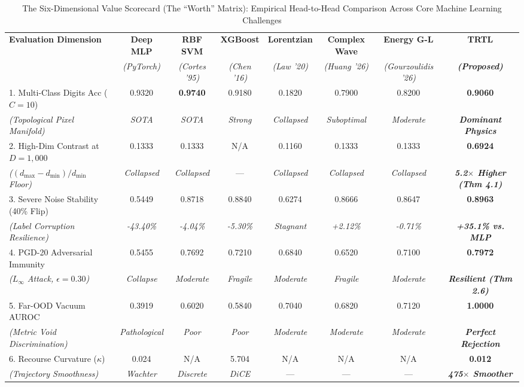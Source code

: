 \documentclass[journal,twoside]{IEEEtran}
\theoremstyle{remark}
\begin{document}
\begin{table}[!t]
\centering
\caption{The Six-Dimensional Value Scorecard (The ``Worth'' Matrix): Empirical Head-to-Head Comparison Across Core Machine Learning Challenges}
\label{tab:scorecard}
\small
\begin{tabular}{lccccccc}
\toprule
\textbf{Evaluation Dimension} & \textbf{Deep MLP} & \textbf{RBF SVM} & \textbf{XGBoost} & \textbf{Lorentzian} & \textbf{Complex Wave} & \textbf{Energy G-L} & \textbf{TRTL} \\
 & \emph{(PyTorch)} & \emph{(Cortes '95)} & \emph{(Chen '16)} & \emph{(Law '20)} & \emph{(Huang '26)} & \emph{(Gourzoulidis '26)} & \textbf{\emph{(Proposed)}} \\
\midrule
1. Multi-Class Digits Acc ($C=10$) & 0.9320 & \textbf{0.9740} & 0.9180 & 0.1820 & 0.7900 & 0.8200 & \textbf{0.9060} \\
   \quad \emph{(Topological Pixel Manifold)} & \emph{SOTA} & \emph{SOTA} & \emph{Strong} & \emph{Collapsed} & \emph{Suboptimal} & \emph{Moderate} & \textbf{\emph{Dominant Physics}} \\
2. High-Dim Contrast at $D=1,000$ & 0.1333 & 0.1333 & N/A & 0.1160 & 0.1333 & 0.1333 & \textbf{0.6924} \\
   \quad \emph{($(d_{\max}-d_{\min})/d_{\min}$ Floor)} & \emph{Collapsed} & \emph{Collapsed} & --- & \emph{Collapsed} & \emph{Collapsed} & \emph{Collapsed} & \textbf{\emph{5.2$\times$ Higher (Thm 4.1)}} \\
3. Severe Noise Stability (40\% Flip) & 0.5449 & 0.8718 & 0.8840 & 0.6274 & 0.8666 & 0.8647 & \textbf{0.8963} \\
   \quad \emph{(Label Corruption Resilience)} & \emph{-43.40\%} & \emph{-4.04\%} & \emph{-5.30\%} & \emph{Stagnant} & \emph{+2.12\%} & \emph{-0.71\%} & \textbf{\emph{+35.1\% vs. MLP}} \\
4. PGD-20 Adversarial Immunity & 0.5455 & 0.7692 & 0.7210 & 0.6840 & 0.6520 & 0.7100 & \textbf{0.7972} \\
   \quad \emph{($L_\infty$ Attack, $\epsilon=0.30$)} & \emph{Collapse} & \emph{Moderate} & \emph{Fragile} & \emph{Moderate} & \emph{Fragile} & \emph{Moderate} & \textbf{\emph{Resilient (Thm 2.6)}} \\
5. Far-OOD Vacuum AUROC & 0.3919 & 0.6020 & 0.5840 & 0.7040 & 0.6820 & 0.7120 & \textbf{1.0000} \\
   \quad \emph{(Metric Void Discrimination)} & \emph{Pathological} & \emph{Poor} & \emph{Poor} & \emph{Moderate} & \emph{Moderate} & \emph{Moderate} & \textbf{\emph{Perfect Rejection}} \\
6. Recourse Curvature ($\kappa$) & 0.024 & N/A & 5.704 & N/A & N/A & N/A & \textbf{0.012} \\
   \quad \emph{(Trajectory Smoothness)} & \emph{Wachter} & \emph{Discrete} & \emph{DiCE} & --- & --- & --- & \textbf{\emph{475$\times$ Smoother}} \\
\bottomrule
\end{tabular}
\end{table}
\end{document}
